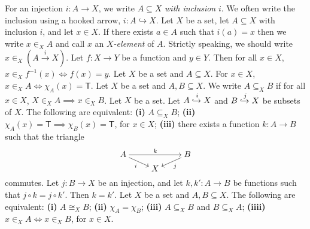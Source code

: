  For an injection $i \colon A \to X$, we write $A \subseteq X$ \textit{with inclusion} $i$. We often write the inclusion using a hooked arrow, $i \colon A \hookrightarrow X$.
 Let $X$ be a set, let $A \subseteq X$ with inclusion $i$, and let $x \in X$. If there exists $a \in A$ such that $i(a) = x$ then we write $x \in_X A$ and call $x$ an \textit{$X$-element} of $A$. Strictly speaking, we should write $x \in_X (A \xrightarrow{i} X)$.
 Let $f \colon X \to Y$ be a function and $y \in Y$. Then for all $x \in X$, $x \in_X f^{-1}(x) \iff f(x) = y$.
 Let $X$ be a set and $A \subseteq X$. For $x \in X$, $x \in_X A \iff \chi_A(x) = \mathsf{T}$.
 Let $X$ be a set and $A, B \subseteq X$. We write $A \subseteq_X B$ if for all $x \in X$, $X \in_X A \implies x \in_X B$.
 Let $X$ be a set. Let $A \xhookrightarrow{i} X$ and $B \xhookrightarrow{j} X$ be subsets of $X$. The following are equivalent: \textbf{(i)} $A \subseteq_X B$; \textbf{(ii)} $\chi_A(x) = \mathsf{T} \implies \chi_B(x) = \mathsf{T}$, for $x \in X$; \textbf{(iii)} there exists a function $k \colon A \to B$ such that the triangle
\[\begin{tikzcd}[cramped,row sep=tiny]
    A && B \\
    & X
    \arrow["k", from=1-1, to=1-3]
    \arrow["i"', from=1-1, to=2-2]
    \arrow["j", from=1-3, to=2-2]
\end{tikzcd}\]
commutes.
 Let $j \colon B \to X$ be an injection, and let $k, k' \colon A \to B$ be functions such that $j \circ k = j \circ k'$. Then $k = k'$.
 Let $X$ be a set and $A, B \subseteq X$. The following are equivalent: \textbf{(i)} $A \cong_X B$; \textbf{(ii)} $\chi_A = \chi_B$; \textbf{(iii)} $A \subseteq_X B$ and $B \subseteq_X A$; \textbf{(iiii)} $x \in_X A \iff x \in_X B$, for $x \in X$.
